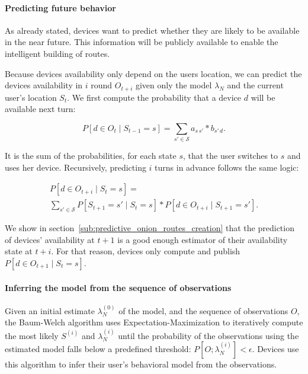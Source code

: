 
\paragraph*{Predicting future behavior} 
\label{para:predicting future behavior}
As already stated, devices want to predict whether they are likely to be available in the near future.
This information will be publicly available to enable the intelligent building of routes.

Because devices availability only depend on the users location, we can predict the devices availability in $i$ round $O_{t+i}$ given only the model $\lambda_N$ and the current user's location $S_t$. We first compute the probability that a device $d$ will be available next turn:

$$
P\left[ d \in O_{t} \mid S_{t-1} = s \right] = 
\sum\limits_{s' \in \mathcal{S}} 
a_{s\,s'} * b_{s'\,d}.
$$

It is the sum of the probabilities, for each state $s$, that the user switches to $s$ and uses her device.
Recursively, predicting $i$ turns in advance follows the same logic:

\begin{multline*}
P\left[ d \in O_{t+i} \mid S_{t} = s \right] = \\
\sum\limits_{s' \in \mathcal{S}}
P\left[ S_{t+1} = s' \mid S_t = s \right] * 
P\left[ d \in O_{t+i} \mid S_{t+1} = s'\right].
\end{multline*}

We show in section~\ref{sub:predictive_onion_routes_creation} that the prediction of devices' availability at $t+1$ is a good enough estimator of their availability state at $t+i$.
For that reason, devices only compute and publish $P\left[ d \in O_{t+1} \mid S_{t} = s \right]$.

\paragraph*{Inferring the model from the sequence of observations}

Given an initial estimate $\lambda_{N}^{(0)}$ of the model, and the sequence of observations $O$, the Baum-Welch algorithm uses Expectation-Maximization to iteratively compute the most likely $S^{(i)}$ and $\lambda_{N}^{(i)}$ until the probability of the observations using the estimated model falls below a predefined threshold: $P[O; \lambda_{N}^{(i)}] < \epsilon$.
Devices use this algorithm to infer their user's behavioral model from the observations.

